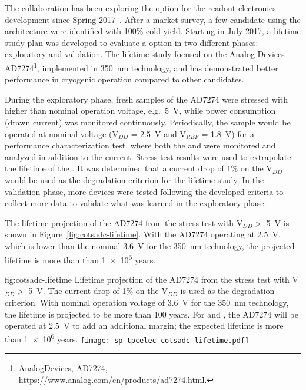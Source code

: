 \label{sec:fdsp-tpcelec-design-femb-alt-cots}

The  collaboration has been exploring the   option 
for the  readout electronics development since Spring
2017~\cite{Chen:2018zic}. After a market survey, a few candidate  
using the  architecture were identified with 100\% cold yield. Starting in
July 2017, a lifetime study plan was developed to evaluate a  
 option in two different phases: exploratory and validation. The 
lifetime study focused on the Analog Devices AD7274\footnote{AnalogDevices,
  AD7274\texttrademark{}, \url{https://www.analog.com/en/products/ad7274.html}.},
implemented in  \SI{350}{nm}  technology, and has
demonstrated better performance in cryogenic operation compared to other candidates.

During the exploratory phase, fresh samples of the   
AD7274 were stressed with higher than nominal operation voltage, e.g.~\SI{5}{V},
while power consumption (drawn current) was monitored continuously. 
Periodically, the sample would be operated at nominal voltage (V$_{DD}$ = \SI{2.5}{V} 
and V$_{REF}$ = \SI{1.8}{V}) for a performance characterization test, where 
both the  and  were monitored and analyzed in addition 
to the current. %
Stress test results were used to extrapolate the 
lifetime of the  . It was determined that a current drop 
of \num{1}\% on the V$_{DD}$ would be used as the degradation criterion for the lifetime 
study. In the validation phase, more devices were tested following the developed 
criteria to collect more data to validate what was learned in the exploratory phase.

The lifetime projection of the AD7274  from the stress 
test with V$_{DD} >$ \SI{5}{V} is shown in Figure~\ref{fig:cotsadc-lifetime}. 
With the AD7274 operating at \SI{2.5}{V}, which is lower than the nominal 
\SI{3.6}{V} for the \SI{350}{nm}  technology, the projected lifetime 
is more than than \num{1e6} years.

\begin{dunefigure}
{fig:cotsadc-lifetime}
{Lifetime projection of the   AD7274 from the stress test 
with V$_{DD} >$ \SI{5}{V}. The current drop of 1\% on the V$_{DD}$ is used as 
the degradation criterion. With nominal operation voltage of \SI{3.6}{V} for the 
\SI{350}{nm}  technology, the lifetime is projected to be more 
than 100 years. For  and  , the AD7274 will be
operated at \SI{2.5}{V} to add an additional margin; the expected lifetime is more 
than \num{1e6} years.}
\texttt{[image: sp-tpcelec-cotsadc-lifetime.pdf]}
\end{dunefigure}

